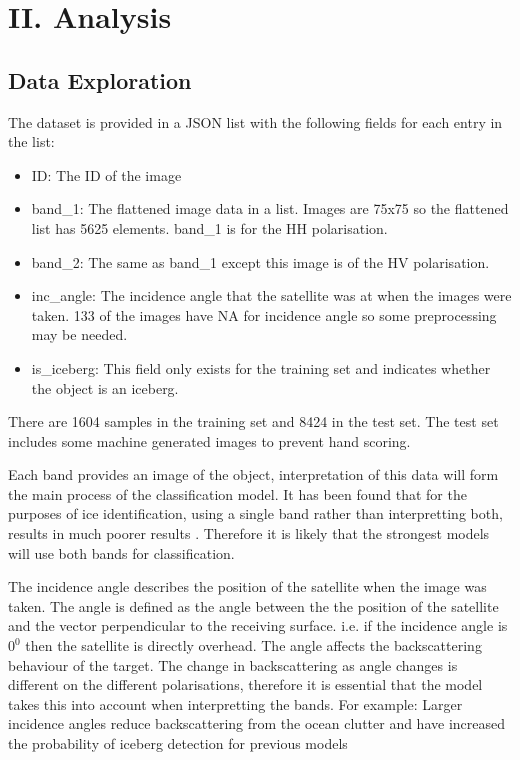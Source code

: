 \documentclass{article}
\begin{document}
\section{II. Analysis}
\subsection{Data Exploration}
The dataset is provided in a JSON list with the following fields for each entry in the list:
\begin{itemize}
\item ID: The ID of the image
\item band\_1: The flattened image data in a list. Images are 75x75 so the flattened list has 5625 elements. band\_1 is for the HH polarisation.
\item band\_2: The same as band\_1 except this image is of the HV polarisation.
\item inc\_angle: The incidence angle that the satellite was at when the images were taken. 133 of the images have NA for incidence angle so some preprocessing may be needed.
\item is\_iceberg: This field only exists for the training set and indicates whether the object is an iceberg.
\end{itemize}
There are 1604 samples in the training set and 8424 in the test set. The test set includes some machine generated images to prevent hand scoring. 

Each band provides an image of the object, interpretation of this data will form the main process of the classification model. It has been found that for the purposes of ice identification, using a single band rather than interpretting both, results in much poorer results \cite{radarsat-mode-selection,yu}. Therefore it is likely that the strongest models will use both bands for classification.

The incidence angle describes the position of the satellite when the image was taken. The angle is defined as the angle between the the position of the satellite and the vector perpendicular to the receiving surface. i.e. if the incidence angle is $0^0$ then the satellite is directly overhead. The angle affects the backscattering behaviour of the target. The change in backscattering as angle changes is different on the different polarisations, therefore it is essential that the model takes this into account when interpretting the bands. For example: Larger incidence angles reduce backscattering from the ocean clutter and have increased the probability of iceberg detection for previous models \cite{radarsat-mode-selection}
\end{document}
